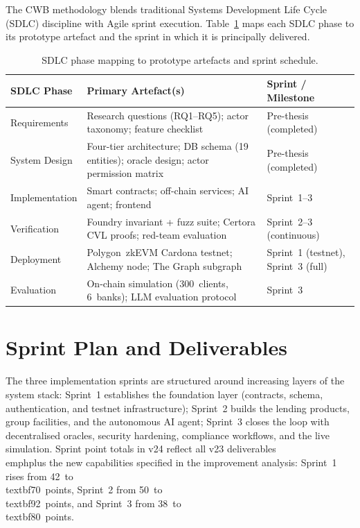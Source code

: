The CWB methodology blends traditional Systems Development Life Cycle (SDLC)
discipline with Agile sprint execution. Table~\ref{tab:sdlc-phases} maps each
SDLC phase to its prototype artefact and the sprint in which it is
principally delivered.

\begin{table}[H]
\centering
\caption{SDLC phase mapping to prototype artefacts and sprint schedule.}
\label{tab:sdlc-phases}
\small
\begin{tabular}{p{3.0cm}p{4.8cm}p{4.7cm}}
\hline
\textbf{SDLC Phase} & \textbf{Primary Artefact(s)} & \textbf{Sprint / Milestone} \\
\hline
Requirements         & Research questions (RQ1--RQ5); actor taxonomy; feature checklist & Pre-thesis (completed) \\
System Design        & Four-tier architecture; DB schema (19 entities); oracle design; actor permission matrix & Pre-thesis (completed) \\
Implementation       & Smart contracts; off-chain services; AI agent; frontend & Sprint~1--3 \\
Verification         & Foundry invariant + fuzz suite; Certora CVL proofs; red-team evaluation & Sprint~2--3 (continuous) \\
Deployment           & Polygon~zkEVM Cardona testnet; Alchemy node; The Graph subgraph & Sprint~1 (testnet), Sprint~3 (full) \\
Evaluation           & On-chain simulation (300~clients, 6~banks); LLM evaluation protocol & Sprint~3 \\
\hline
\end{tabular}
\end{table}

\section{Sprint Plan and Deliverables}
\label{sec:sprint-plan}

The three implementation sprints are structured around increasing layers of
the system stack: Sprint~1 establishes the foundation layer (contracts,
schema, authentication, and testnet infrastructure); Sprint~2 builds the
lending products, group facilities, and the autonomous AI agent; Sprint~3
closes the loop with decentralised oracles, security hardening, compliance
workflows, and the live simulation. Sprint point totals in v24 reflect all
v23 deliverables \\emph{plus} the new capabilities specified in the
improvement analysis: Sprint~1 rises from 42~to \\textbf{70}~points,
Sprint~2 from 50~to \\textbf{92}~points, and Sprint~3 from 38~to
\\textbf{80}~points.

